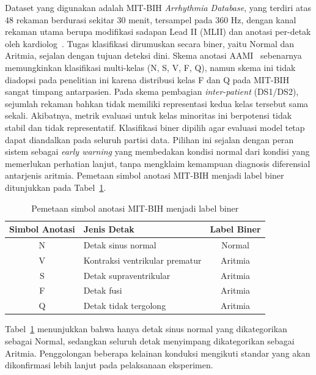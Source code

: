 Dataset yang digunakan adalah MIT-BIH \textit{Arrhythmia Database}, yang terdiri atas 48 rekaman berdurasi sekitar 30 menit, tersampel pada 360 Hz, dengan kanal rekaman utama berupa modifikasi sadapan Lead II (MLII) dan anotasi per-detak oleh kardiolog~\cite{moody_mark_2001}. Tugas klasifikasi dirumuskan secara biner, yaitu Normal dan Aritmia, sejalan dengan tujuan deteksi dini. Skema anotasi AAMI~\cite{aami_ec57_2012} sebenarnya memungkinkan klasifikasi multi-kelas (N, S, V, F, Q), namun skema ini tidak diadopsi pada penelitian ini karena distribusi kelas F dan Q pada MIT-BIH sangat timpang antarpasien. Pada skema pembagian \textit{inter-patient} (DS1/DS2), sejumlah rekaman bahkan tidak memiliki representasi kedua kelas tersebut sama sekali. Akibatnya, metrik evaluasi untuk kelas minoritas ini berpotensi tidak stabil dan tidak representatif. Klasifikasi biner dipilih agar evaluasi model tetap dapat diandalkan pada seluruh partisi data. Pilihan ini sejalan dengan peran sistem sebagai \textit{early warning} yang membedakan kondisi normal dari kondisi yang memerlukan perhatian lanjut, tanpa mengklaim kemampuan diagnosis diferensial antarjenis aritmia. Pemetaan simbol anotasi MIT-BIH menjadi label biner ditunjukkan pada Tabel~\ref{tab:pemetaan-label}.

\begin{table}[!ht]
  \centering
  \caption{Pemetaan simbol anotasi MIT-BIH menjadi label biner}
  \label{tab:pemetaan-label}
  \begin{tabular}{|c|l|c|}
    \hline
    \rowcolor{headgray}
    \textbf{Simbol Anotasi} & \textbf{Jenis Detak} & \textbf{Label Biner} \\
    \hline
    N & Detak sinus normal & Normal \\
    \hline
    V & Kontraksi ventrikular prematur & Aritmia \\
    \hline
    S & Detak supraventrikular & Aritmia \\
    \hline
    F & Detak fusi & Aritmia \\
    \hline
    Q & Detak tidak tergolong & Aritmia \\
    \hline
  \end{tabular}
\end{table}

Tabel~\ref{tab:pemetaan-label} menunjukkan bahwa hanya detak sinus normal yang dikategorikan sebagai Normal, sedangkan seluruh detak menyimpang dikategorikan sebagai Aritmia. Penggolongan beberapa kelainan konduksi mengikuti standar yang akan dikonfirmasi lebih lanjut pada pelaksanaan eksperimen.

